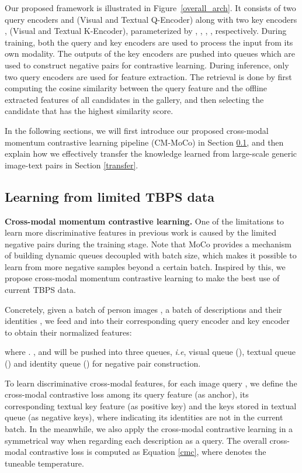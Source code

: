 \documentclass{bmvc2k}
\def\ie{\emph{i.e}\bmvaOneDot}
\newcommand{\statement}[1]{\noindent\textbf{#1}}
\begin{document}
Our proposed framework is illustrated in Figure~\ref{overall_arch}. 
It consists of two query encoders  and  (Visual and Textual Q-Encoder) along with two key encoders ,  (Visual and Textual K-Encoder), parameterized by , , , , respectively. 
During training, both the query and key encoders are used to process the input from its own modality. 
The outputs of the key encoders are pushed into queues which are used to construct negative pairs for contrastive learning. 
During inference, only two query encoders are used for feature extraction. 
The retrieval is done by first computing the cosine similarity between the query feature and the offline extracted features of all candidates in the gallery, and then selecting the candidate that has the highest similarity score.

In the following sections, we will first introduce our proposed cross-modal momentum contrastive learning pipeline (CM-MoCo) in Section \ref{vta}, and then explain how we effectively transfer the knowledge learned from large-scale generic image-text pairs in Section \ref{transfer}.

\vspace*{-3mm}
\subsection{Learning from limited TBPS data}
\label{vta}
\statement{Cross-modal momentum contrastive learning.}
One of the limitations to learn more discriminative features in previous work is caused by the limited negative pairs during the training stage.
Note that MoCo \cite{he2020moco} provides a mechanism of building dynamic queues decoupled with batch size, which makes it possible to learn from more negative samples beyond a certain batch. 
Inspired by this, we propose cross-modal momentum contrastive learning to make the best use of current TBPS data. 

Concretely, given a batch of person images , a batch of descriptions  and their identities , we feed  and  into their corresponding query encoder and key encoder to obtain their normalized features:

where . ,  and  will be pushed into three queues, \ie, visual queue (), textual queue () and identity queue () for negative pair construction. 

To learn discriminative cross-modal features, for each image query , we define the cross-modal contrastive loss among its query feature  (as anchor), its corresponding textual key feature  (as positive key) and the keys stored in textual queue  (as negative keys), where  indicating its identities are not in the current batch. 
In the meanwhile, we also apply the cross-modal contrastive learning in a symmetrical way when regarding each description  as a query. 
The overall cross-modal contrastive loss  is computed as Equation \ref{cmc}, where  denotes the tuneable temperature.
\end{document}
